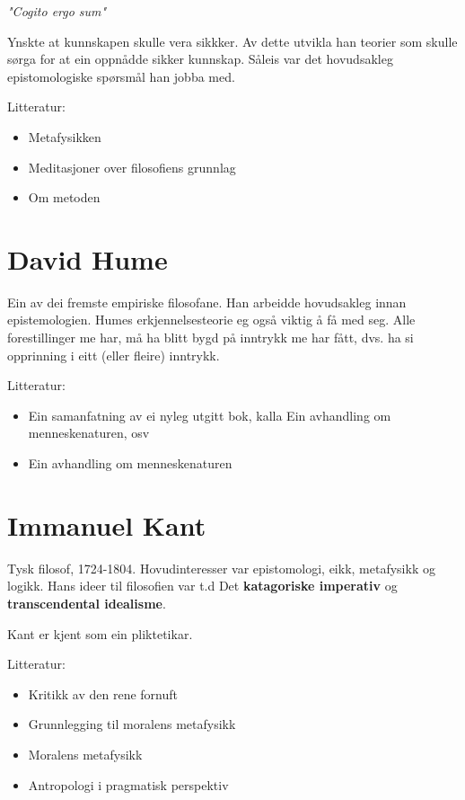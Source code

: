 \documentclass[a4paper]{IEEEtran}
\begin{document}
\textit{"Cogito ergo sum"}\bigskip

Ynskte at kunnskapen skulle vera sikkker. Av dette utvikla han teorier som skulle sørga for at ein oppnådde sikker kunnskap. Såleis var det hovudsakleg epistomologiske spørsmål han jobba med.

\bigskip
Litteratur:
\begin{itemize}
    \item Metafysikken
    \item Meditasjoner over filosofiens grunnlag
    \item Om metoden
\end{itemize}\bigskip 


\section{David Hume}
\label{hume}

Ein av dei fremste empiriske filosofane. Han arbeidde hovudsakleg innan epistemologien. Humes erkjennelsesteorie eg også viktig å få med seg. Alle forestillinger me har, må ha blitt bygd på inntrykk me har fått, dvs. ha si opprinning i eitt (eller fleire) inntrykk.

\bigskip

Litteratur:
\begin{itemize}
    \item Ein samanfatning av ei nyleg utgitt bok, kalla Ein avhandling om menneskenaturen, osv
    \item Ein avhandling om menneskenaturen
\end{itemize}\bigskip 


\section{Immanuel Kant}
\label{kant}

Tysk filosof, 1724-1804. Hovudinteresser var epistomologi, eikk, metafysikk og logikk. Hans ideer til filosofien var t.d Det \textbf{katagoriske imperativ} og \textbf{transcendental idealisme}.\bigskip

Kant er kjent som ein pliktetikar.
\bigskip

Litteratur:
\begin{itemize}
    \item Kritikk av den rene fornuft
    \item Grunnlegging til moralens metafysikk
    \item Moralens metafysikk
    \item Antropologi i pragmatisk perspektiv
\end{itemize}\bigskip 
\end{document}
